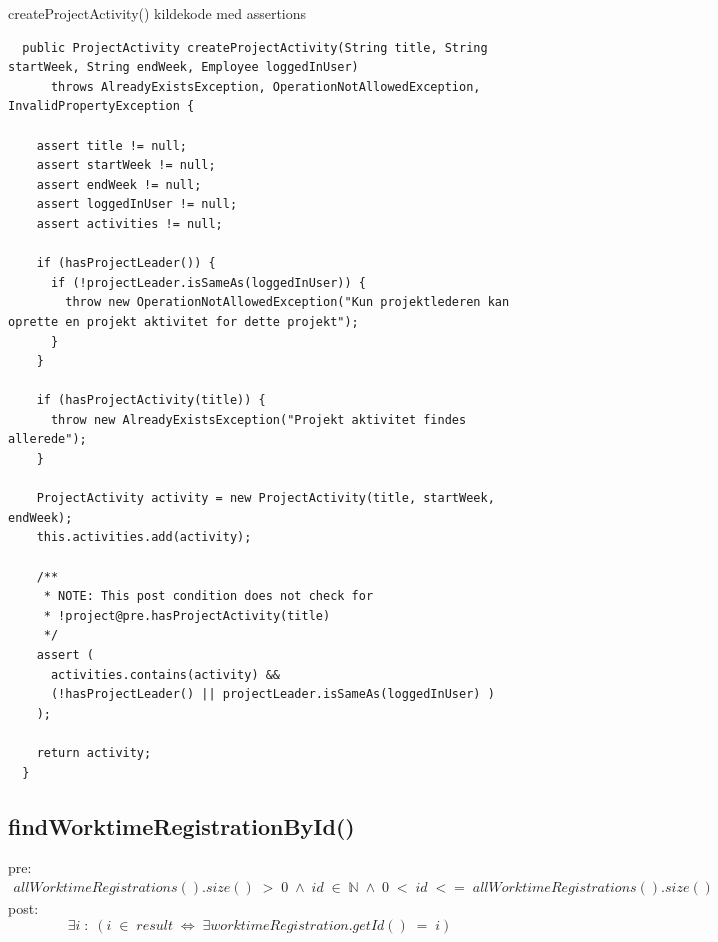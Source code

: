 \begin{listing}[H]
    \centering
    \caption{createProjectActivity() kildekode med assertions}\label{lst:create_project_activity_assertions}
    \begin{verbatim}
  public ProjectActivity createProjectActivity(String title, String startWeek, String endWeek, Employee loggedInUser)
      throws AlreadyExistsException, OperationNotAllowedException, InvalidPropertyException {

    assert title != null;
    assert startWeek != null;
    assert endWeek != null;
    assert loggedInUser != null;
    assert activities != null;

    if (hasProjectLeader()) {
      if (!projectLeader.isSameAs(loggedInUser)) {
        throw new OperationNotAllowedException("Kun projektlederen kan oprette en projekt aktivitet for dette projekt");
      }
    }

    if (hasProjectActivity(title)) {
      throw new AlreadyExistsException("Projekt aktivitet findes allerede");
    }

    ProjectActivity activity = new ProjectActivity(title, startWeek, endWeek);
    this.activities.add(activity);

    /**
     * NOTE: This post condition does not check for 
     * !project@pre.hasProjectActivity(title)
     */
    assert (
      activities.contains(activity) &&
      (!hasProjectLeader() || projectLeader.isSameAs(loggedInUser) )
    );

    return activity;
  }
    \end{verbatim}
\end{listing}


\subsection{findWorktimeRegistrationById()} \label{sec:contract_findd_work}
\noindent pre: 
\begin{align}
    allWorktimeRegistrations().size()\; >\; 0 \;\wedge\; id \; \in \; \mathbb{N} \; \wedge \; 0 \; < \; id  \; <=\; allWorktimeRegistrations().size()
\end{align}
post: 
\begin{equation}
    \exists i\; :\; (i\; \in\; result\; \iff\; \exists worktimeRegistration.getId() \; = \; i)
\end{equation}


